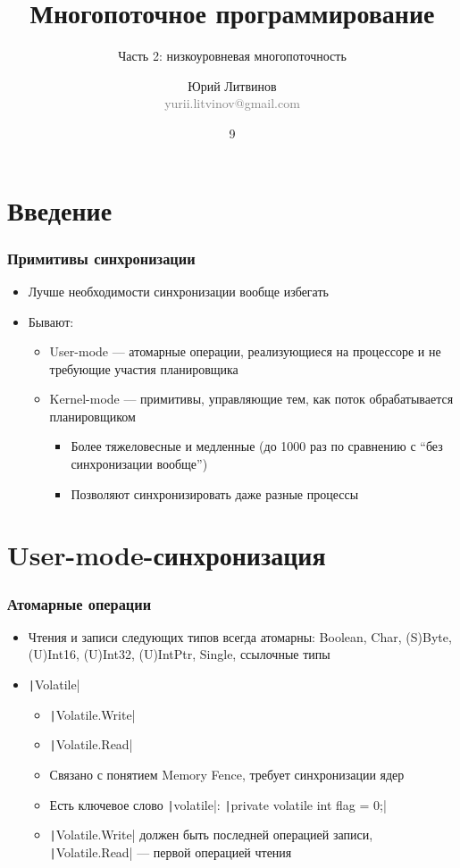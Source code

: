 \documentclass[xetex,mathserif,serif]{beamer}
\title{Многопоточное программирование}
\subtitle{Часть 2: низкоуровневая многопоточность}
\author[Юрий Литвинов]{Юрий Литвинов\\\small{\textcolor{gray}{yurii.litvinov@gmail.com}}}
\date{9}
\begin{document}
	\frame{\titlepage}

	\section{Введение}

	\begin{frame}
		\frametitle{Примитивы синхронизации}
		\begin{itemize}
			\item Лучше необходимости синхронизации вообще избегать
			\item Бывают:
			\begin{itemize}
				\item User-mode --- атомарные операции, реализующиеся на процессоре и не требующие участия планировщика
				\item Kernel-mode --- примитивы, управляющие тем, как поток обрабатывается планировщиком
				\begin{itemize}
					\item Более тяжеловесные и медленные (до 1000 раз по сравнению с ``без синхронизации вообще'')
					\item Позволяют синхронизировать даже разные процессы
				\end{itemize}
			\end{itemize}
		\end{itemize}
	\end{frame}

	\section{User-mode-синхронизация}

	\begin{frame}
		\frametitle{Атомарные операции}
		\begin{itemize}
			\item Чтения и записи следующих типов всегда атомарны: Boolean, Char, (S)Byte, (U)Int16, (U)Int32, (U)IntPtr, Single, ссылочные типы
			\item \texttt|Volatile|
			\begin{itemize}
				\item \texttt|Volatile.Write|
				\item \texttt|Volatile.Read|
				\item Связано с понятием Memory Fence, требует синхронизации ядер
				\item Есть ключевое слово \texttt|volatile|: \texttt|private volatile int flag = 0;|
				\item \texttt|Volatile.Write| должен быть последней операцией записи, \texttt|Volatile.Read| --- первой операцией чтения
			\end{itemize}
		\end{itemize}
	\end{frame}
\end{document}

